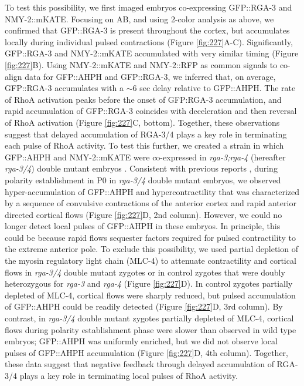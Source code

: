 To test this possibility, we first imaged embryos co-expressing GFP::RGA-3 and NMY-2::mKATE. Focusing on AB, and using 2-color analysis as above, we confirmed that GFP::RGA-3 is present throughout the cortex, but accumulates locally during individual pulsed contractions (Figure \ref{fig:227}A-C). Significantly, GFP::RGA-3 and NMY-2::mKATE accumulated with very similar timing (Figure \ref{fig:227}B). Using NMY-2::mKATE and NMY-2::RFP  as common signals to co-align data for GFP::AHPH and GFP::RGA-3, we inferred that, on average, GFP::RGA-3 accumulates with a $\sim$6 sec delay relative to GFP::AHPH. The rate of RhoA activation peaks before the onset of GFP:RGA-3 accumulation, and rapid accumulation of GFP::RGA-3 coincides with deceleration and then reversal of RhoA activation (Figure \ref{fig:227}C, bottom). Together, these observations suggest that delayed accumulation of RGA-3/4 plays a key role in terminating each pulse of RhoA activity. To test this further, we created a strain in which GFP::AHPH and NMY-2::mKATE were co-expressed in \textit{rga-3;rga-4} (hereafter \textit{rga-3/4}) double mutant embryos  \cite{Zanin:2013el}. Consistent with previous reports  \cite{Schonegg:2007if, Zanin:2013el, Schmutz:2007jq, Tse:2012fp}, during polarity establishment in P0 in \textit{rga-3/4} double mutant embryos, we observed hyper-accumulation of GFP::AHPH and hypercontractility that was characterized by a sequence of convulsive contractions of the anterior cortex and rapid anterior directed cortical flows (Figure \ref{fig:227}D, 2nd column).  However, we could no longer detect local pulses of GFP::AHPH in these embryos.  In principle, this could be because rapid flows sequester factors required for pulsed contractility to the extreme anterior pole. To exclude this possibility, we used partial depletion of the myosin regulatory light chain (MLC-4) to attenuate contractility and cortical flows in \textit{rga-3/4} double mutant zygotes or in control zygotes that were doubly heterozygous for \textit{rga-3} and \textit{rga-4} (Figure \ref{fig:227}D).  In control zygotes partially depleted of MLC-4, cortical flows were sharply reduced, but pulsed accumulation of GFP::AHPH could be readily detected (Figure \ref{fig:227}D, 3rd column). By contrast, in \textit{rga-3/4} double mutant zygotes partially depleted of MLC-4, cortical flows during polarity establishment phase were slower than observed in wild type embryos; GFP::AHPH was uniformly enriched, but we did not observe local pulses of GFP::AHPH accumulation (Figure \ref{fig:227}D, 4th column).  Together, these data suggest that negative feedback through delayed accumulation of RGA-3/4 plays a key role in terminating local pulses of RhoA activity.


